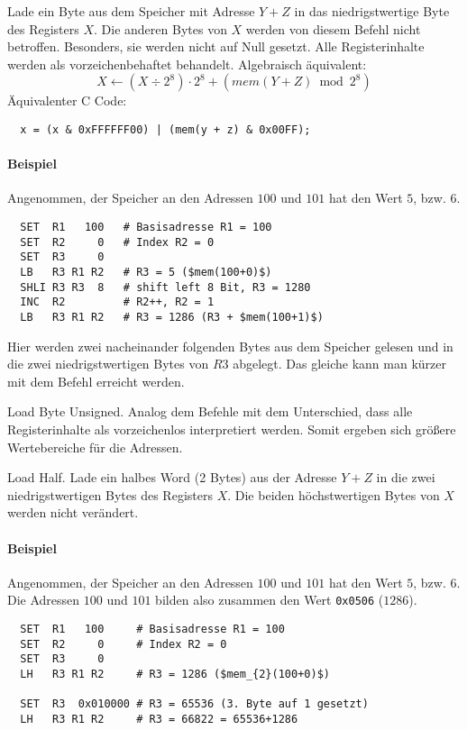 Lade ein Byte aus dem Speicher mit Adresse $Y + Z$ in das niedrigstwertige
Byte des Registers $X$. Die anderen Bytes von $X$ werden von diesem Befehl nicht
betroffen. Besonders, sie werden nicht auf Null gesetzt.
Alle Registerinhalte werden als vorzeichenbehaftet behandelt.
Algebraisch äquivalent:
\[
    X \gets (X \div 2^{8}) \cdot 2^{8} + \left(mem(Y + Z) \bmod 2^{8} \right)
\]
Äquivalenter C Code:
\begin{lstlisting}
  x = (x & 0xFFFFFF00) | (mem(y + z) & 0x00FF);
\end{lstlisting}

\paragraph{Beispiel}
Angenommen, der Speicher an den Adressen $100$ und $101$ hat den Wert $5$,
bzw. $6$.
\begin{lstlisting}
  SET  R1   100   # Basisadresse R1 = 100
  SET  R2     0   # Index R2 = 0
  SET  R3     0
  LB   R3 R1 R2   # R3 = 5 ($mem(100+0)$)
  SHLI R3 R3  8   # shift left 8 Bit, R3 = 1280
  INC  R2         # R2++, R2 = 1
  LB   R3 R1 R2   # R3 = 1286 (R3 + $mem(100+1)$)
\end{lstlisting}
Hier werden zwei nacheinander folgenden Bytes aus dem Speicher gelesen und in
die zwei niedrigstwertigen Bytes von $R3$ abgelegt.
Das gleiche kann man kürzer mit dem Befehl  erreicht werden.




\glqq Load Byte Unsigned\grqq.
Analog dem Befehle  mit dem Unterschied, dass alle Registerinhalte als
vorzeichenlos interpretiert werden. Somit ergeben sich größere Wertebereiche für
die Adressen.


\glqq Load Half\grqq.
Lade ein halbes Word (2 Bytes) aus der Adresse $Y + Z$ in die zwei
niedrigstwertigen Bytes des Registers $X$.
Die beiden höchstwertigen Bytes von $X$ werden nicht verändert.

\paragraph{Beispiel}
Angenommen, der Speicher an den Adressen $100$ und $101$ hat den Wert $5$,
bzw. $6$. Die Adressen $100$ und $101$ bilden also zusammen den Wert
\texttt{0x0506} ($1286$).
\begin{lstlisting}
  SET  R1   100     # Basisadresse R1 = 100
  SET  R2     0     # Index R2 = 0
  SET  R3     0
  LH   R3 R1 R2     # R3 = 1286 ($mem_{2}(100+0)$)

  SET  R3  0x010000 # R3 = 65536 (3. Byte auf 1 gesetzt)
  LH   R3 R1 R2     # R3 = 66822 = 65536+1286
\end{lstlisting}



